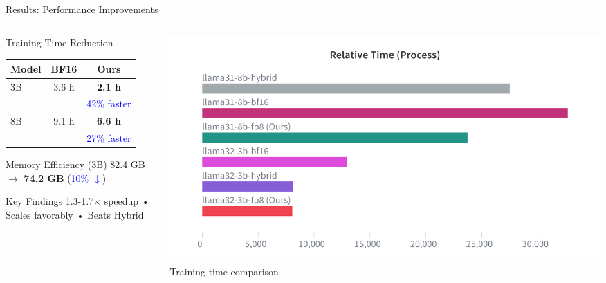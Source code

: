 \begin{frame}[squeeze]{Results: Performance Improvements}

\begin{columns}[c]
\begin{column}{0.55\textwidth}
    \begin{block}{Training Time Reduction}
    \small
    \begin{tabular}{@{}lcc@{}}
    \toprule
    \textbf{Model} & \textbf{BF16} & \textbf{Ours} \\
    \midrule
    3B & 3.6 h & \textbf{2.1 h} \\
    & & {\footnotesize \textcolor{blue}{42\% faster}} \\
    \midrule
    8B & 9.1 h & \textbf{6.6 h} \\
    & & {\footnotesize \textcolor{blue}{27\% faster}} \\
    \bottomrule
    \end{tabular}
    \end{block}

    \vspace{0.15cm}

    \begin{block}{Memory Efficiency (3B)}
    \small
    82.4 GB $\rightarrow$ \textbf{74.2 GB} (\textcolor{blue}{10\% $\downarrow$})
    \end{block}

    \vspace{0.15cm}

    \begin{alertblock}{Key Findings}
    \small
    1.3-1.7$\times$ speedup • Scales favorably • Beats Hybrid
    \end{alertblock}
\end{column}

\begin{column}{0.42\textwidth}
    \centering
    \includegraphics[width=\textwidth]{figures/training_time.png}
    {\tiny Training time comparison}
\end{column}
\end{columns}

\end{frame}
